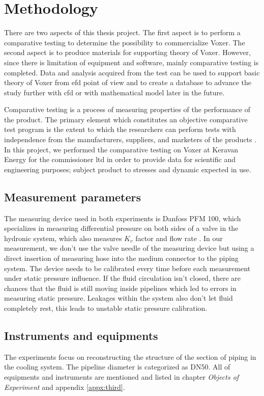 
\chapter{Methodology}

There are two aspects of this thesis project. The first aspect is to perform a comparative testing to determine the possibility to commercialize Voxer. The second aspect is to produce materials for supporting theory of Voxer. However, since there is limitation of equipment and software, mainly comparative testing is completed. Data and analysis acquired from the test can be used to support basic theory of Voxer from \gls{efd} point of view and to create a database to advance the study further with \gls{cfd} or with mathematical model later in the future.

Comparative testing is a process of measuring properties of the performance of the product. The primary element which constitutes an objective comparative test program is the extent to which the researchers can perform tests with independence from the manufacturers, suppliers, and marketers of the products \cite{test:book}. In this project, we performed the comparative testing on Voxer at Keravan Energy for the commissioner \gls{ltd} in order to provide data for scientific and engineering purposes; subject product to stresses and dynamic expected in use. 

\section{Measurement parameters}

The measuring device used in both experiments is Danfoss PFM 100, which specializes in measuring differential pressure on both sides of a valve in the hydronic system, which also measures $K_{v}$ factor and flow rate \cite{danfoss:web}. In our measurement, we don't use the valve needle of the measuring device but using a direct insertion of measuring hose into the medium connector to the piping system. The device needs to be calibrated every time before each measurement under static pressure influence. If the fluid circulation isn't closed, there are chances that the fluid is still moving inside pipelines which led to errors in measuring static pressure. Leakages within the system also don't let fluid completely rest, this leads to unstable static pressure calibration.
  
\section{Instruments and equipments}
The experiments focus on reconstructing the structure of the section of piping in the cooling system. The pipeline diameter is categorized as DN50. 
All of equipments and instruments are mentioned and listed in chapter \textit{Objects of Experiment} and appendix \ref{appx:third}.

